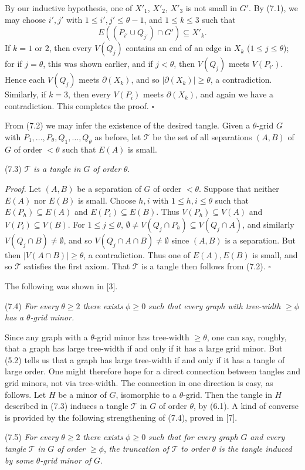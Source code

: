 By our inductive hypothesis, one of $X'_1$, $X'_2$, $X'_3$ is not small in $G'$. By (7.1), we may choose $i', j'$ with $1 \le i', j' \le \theta - 1$, and $1 \le k \le 3$ such that
\begin{equation*}
E((P_{i'} \cup Q_{j'}) \cap G') \subseteq X'_k.
\end{equation*}
If $k = 1$ or $2$, then every $V(Q_j)$ contains an end of an edge in $X_k$ ($1 \le j \le \theta$); for if $j = \theta$, this was shown earlier, and if $j < \theta$, then $V(Q_j)$ meets $V(P_{i'})$. Hence each $V(Q_j)$ meets $\partial(X_k)$, and so $|\partial(X_k)| \ge \theta$, a contradiction. Similarly, if $k = 3$, then every $V(P_i)$ meets $\partial(X_k)$, and again we have a contradiction. This completes the proof. $\square$

From (7.2) we may infer the existence of the desired tangle. Given a $\theta$-grid $G$ with $P_1, \dots, P_\theta, Q_1, \dots, Q_\theta$ as before, let $\mathscr{T}$ be the set of all separations $(A, B)$ of $G$ of order $<\theta$ such that $E(A)$ is small.

\stmt
(7.3) $\mathscr{T}$ \textit{is a tangle in} $G$ \textit{of order} $\theta$.

\textit{Proof.} Let $(A, B)$ be a separation of $G$ of order $<\theta$. Suppose that neither $E(A)$ nor $E(B)$ is small. Choose $h, i$ with $1 \le h, i \le \theta$ such that $E(P_h) \subseteq E(A)$ and $E(P_i) \subseteq E(B)$. Thus $V(P_h) \subseteq V(A)$ and $V(P_i) \subseteq V(B)$. For $1 \le j \le \theta$, $\emptyset \ne V(Q_j \cap P_h) \subseteq V(Q_j \cap A)$, and similarly $V(Q_j \cap B) \ne \emptyset$, and so $V(Q_j \cap A \cap B) \ne \emptyset$ since $(A, B)$ is a separation. But then $|V(A \cap B)| \ge \theta$, a contradiction. Thus one of $E(A), E(B)$ is small, and so $\mathscr{T}$ satisfies the first axiom. That $\mathscr{T}$ is a tangle then follows from (7.2). $\square$

The following was shown in [3].

\stmt
(7.4) \textit{For every} $\theta \ge 2$ \textit{there exists} $\phi \ge 0$ \textit{such that every graph with tree-width} $\ge \phi$ \textit{has a} $\theta$\textit{-grid minor.}

Since any graph with a $\theta$-grid minor has tree-width $\ge \theta$, one can say, roughly, that a graph has large tree-width if and only if it has a large grid minor. But (5.2) tells us that a graph has large tree-width if and only if it has a tangle of large order. One might therefore hope for a direct connection between tangles and grid minors, not via tree-width. The connection in one direction is easy, as follows. Let $H$ be a minor of $G$, isomorphic to a $\theta$-grid. Then the tangle in $H$ described in (7.3) induces a tangle $\mathscr{T}$ in $G$ of order $\theta$, by (6.1). A kind of converse is provided by the following strengthening of (7.4), proved in [7].

\stmt
(7.5) \textit{For every} $\theta \ge 2$ \textit{there exists} $\phi \ge 0$ \textit{such that for every graph} $G$ \textit{and every tangle} $\mathscr{T}$ \textit{in} $G$ \textit{of order} $\ge \phi$, \textit{the truncation of} $\mathscr{T}$ \textit{to order} $\theta$ \textit{is the tangle induced by some} $\theta$\textit{-grid minor of} $G$.
